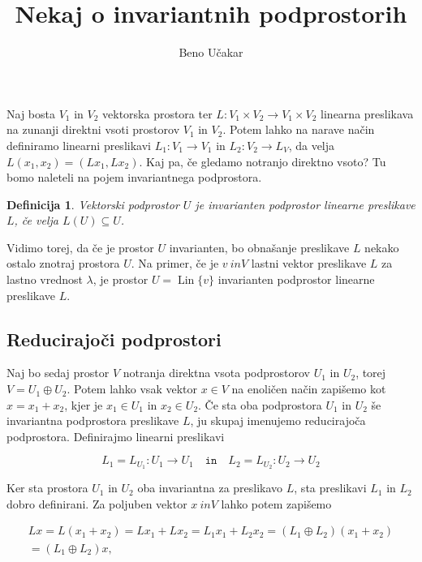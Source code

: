 \documentclass[a4paper,12pt]{article}
\title{Nekaj o invariantnih podprostorih}
\author{Beno Učakar}
\date{}
\newtheorem{definicija}{Definicija}
\DeclareMathOperator{\Lin}{Lin}
\begin{document}
\maketitle

Naj bosta $V_1$ in $V_2$ vektorska prostora ter $L \colon V_1 \times V_2 \to V_1 \times V_2$ linearna preslikava na zunanji direktni vsoti prostorov $V_1$ in $V_2$.
Potem lahko na narave način definiramo linearni preslikavi $L_1 \colon V_1 \to V_1$ in $L_2 \colon V_2 \to L_V$, da velja  
\(L(x_1, x_2) = (Lx_1, Lx_2).\)
Kaj pa, če gledamo notranjo direktno vsoto? Tu bomo naleteli na pojem invariantnega podprostora.

    \begin{definicija}
	Vektorski podprostor $U$ je \emph{invarianten podprostor} linearne preslikave $L$, če velja 
    $L(U)\subseteq U$.
    \end{definicija}

Vidimo torej, da če je prostor $U$ invarianten, bo obnašanje preslikave $L$ nekako ostalo znotraj prostora $U$.
Na primer, če je $v\ inV$ lastni vektor preslikave $L$ za lastno vrednost $\lambda$, je prostor 
\(U = \Lin \{ v \}\) invarianten podprostor linearne preslikave $L$.

\subsection*{Reducirajoči podprostori}

Naj bo sedaj prostor $V$ notranja direktna vsota podprostorov $U_1$ in $U_2$, torej $V = U_1 \oplus U_2$.
Potem lahko vsak vektor $x\in V$ na enoličen način zapišemo kot $x = x_1 + x_2$, kjer je $x_1\in U_1$ in $x_2\in U_2$.
Če sta oba podprostora $U_1$ in $U_2$ še invariantna podprostora preslikave $L$, ju skupaj imenujemo reducirajoča podprostora.
Definirajmo linearni preslikavi 

$$L_1 = L _{U_1} \colon U_1 \to U_1\quad \texttt{in}\quad L_2 = L _{U_2} \colon U_2 \to U_2$$

Ker sta prostora $U_1$ in $U_2$ oba invariantna za preslikavo $L$, sta preslikavi $L_1$ in $L_2$ dobro definirani.
Za poljuben vektor $x\ inV$ lahko potem zapišemo 

\begin{multline}
	Lx = L(x_1 + x_2) = Lx_1+ Lx_2 = L_1x_1 + L_2x_2 = (L_1 \oplus L_2)(x_1 + x_2)\\
     = (L_1 \oplus L_2)x,
\end{multline}
\end{document}
